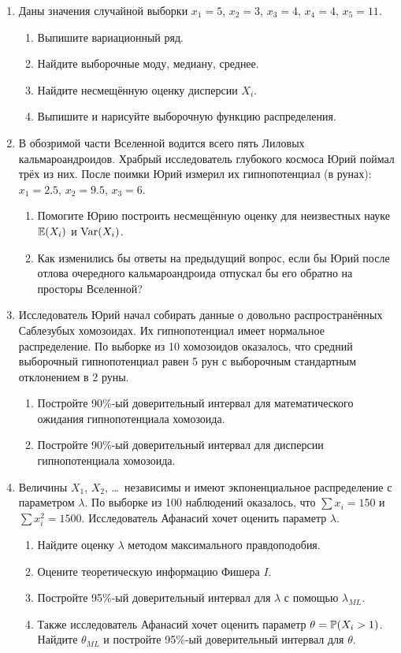\documentclass[12pt, a4paper]{article}\usepackage[]{graphicx}\usepackage[]{color}
\begin{document}
\begin{enumerate}
\item  Даны значения случайной выборки $x_1=5$, $x_2=3$, $x_3=4$, $x_4=4$, $x_5=11$.
\begin{enumerate}
\item Выпишите вариационный ряд.
\item	Найдите выборочные моду, медиану, среднее.
\item Найдите несмещённую оценку дисперсии $X_i$.
\item Выпишите и нарисуйте выборочную функцию распределения.
\end{enumerate}

\item В обозримой части Вселенной водится всего пять Лиловых кальмароандроидов. Храбрый исследователь глубокого космоса Юрий поймал трёх из них. После поимки Юрий измерил их гипнопотенциал (в рунах): $x_1 = 2.5$, $x_2 = 9.5$, $x_3 = 6$.
\begin{enumerate}
\item Помогите Юрию построить несмещённую оценку для неизвестных науке $\E(X_i)$ и $\Var(X_i)$.
\item Как изменились бы ответы на предыдущий вопрос, если бы Юрий после отлова очередного кальмароандроида отпускал бы его обратно на просторы Вселенной?
\end{enumerate}

\item Исследователь Юрий начал собирать данные о довольно распространённых Саблезубых хомозоидах. Их гипнопотенциал имеет нормальное распределение. По выборке из 10 хомозоидов оказалось, что средний выборочный гипнопотенциал равен 5 рун с выборочным стандартным отклонением в 2 руны.
\begin{enumerate}
  \item Постройте 90\%-ый доверительный интервал для математического ожидания гипнопотенциала хомозоида.
  \item Постройте 90\%-ый доверительный интервал для дисперсии гипнопотенциала хомозоида.
\end{enumerate}


\item   Величины $X_1$, $X_2$, \ldots~независимы и имеют экпоненциальное распределение с параметром $\lambda$. По выборке из 100 наблюдений оказалось, что $\sum x_i = 150$ и $\sum x_i^2 = 1500$. Исследователь Афанасий хочет оценить параметр $\lambda$.
\begin{enumerate}
  \item Найдите оценку $\lambda$ методом максимального правдоподобия.
  \item Оцените теоретическую информацию Фишера $I$.
  \item Постройте 95\%-ый доверительный интервал для $\lambda$ с помощью $\lambda_{ML}$.
  \item Также исследователь Афанасий хочет оценить параметр $\theta = \P(X_i > 1)$. Найдите $\theta_{ML}$ и постройте 95\%-ый доверительный интервал для $\theta$.
\end{enumerate}



\end{enumerate}
\end{document}
